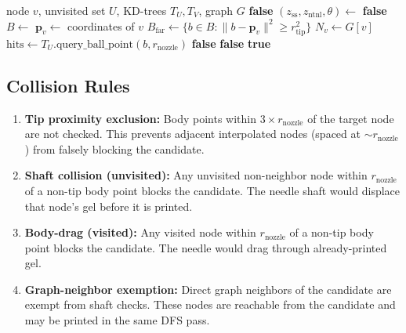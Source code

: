\documentclass[11pt,a4paper]{article}
\begin{document}
\begin{algorithm}[H]
\caption{CTR Collision Validity Check}
\begin{algorithmic}[1]
\Require node $v$, unvisited set $U$, KD-trees $T_U, T_V$, graph $G$
 \Return \textbf{false} \EndIf
\State $(z_\text{ss}, z_\text{ntnl}, \theta) \gets$ 
 \Return \textbf{false} \EndIf
\State $B \gets$  
\State $\mathbf{p}_v \gets$ coordinates of $v$
\State $B_\text{far} \gets \{b \in B : \|b - \mathbf{p}_v\|^2 \geq r_\text{tip}^2\}$ 
\State $N_v \gets G[v]$ 
 
    \State $\text{hits} \gets T_U.\text{query\_ball\_point}(b, r_\text{nozzle})$
         \Return \textbf{false} \EndIf
    \EndFor
\EndFor
{} 
     \Return \textbf{false} \EndIf
\EndFor
\Return \textbf{true}
\end{algorithmic}
\end{algorithm}

\subsection{Collision Rules}

\begin{enumerate}[nosep]
    \item \textbf{Tip proximity exclusion:} Body points within $3 \times r_\text{nozzle}$ of the target node are not checked. This prevents adjacent interpolated nodes (spaced at $\sim r_\text{nozzle}$) from falsely blocking the candidate.

    \item \textbf{Shaft collision (unvisited):} Any unvisited non-neighbor node within $r_\text{nozzle}$ of a non-tip body point blocks the candidate. The needle shaft would displace that node's gel before it is printed.

    \item \textbf{Body-drag (visited):} Any visited node within $r_\text{nozzle}$ of a non-tip body point blocks the candidate. The needle would drag through already-printed gel.

    \item \textbf{Graph-neighbor exemption:} Direct graph neighbors of the candidate are exempt from shaft checks. These nodes are reachable from the candidate and may be printed in the same DFS pass.
\end{enumerate}
\end{document}
